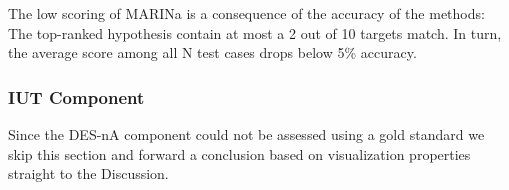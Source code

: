 The low scoring of MARINa is a consequence of the accuracy of the methods: The top-ranked hypothesis contain at most a 2 out of 10 targets match. In turn, the average score among all N test cases drops below 5\% accuracy.


\subsubsection{IUT Component}
Since the DES-nA component could not be assessed using a gold standard we skip this section and forward a conclusion based on visualization properties straight to the Discussion.